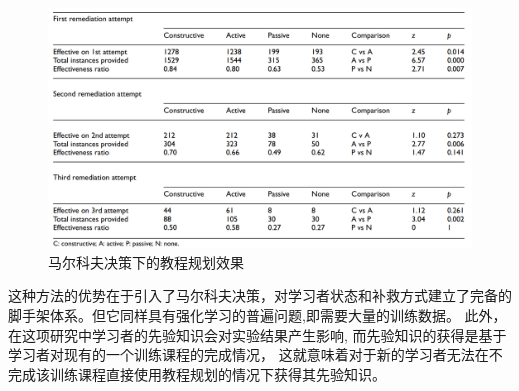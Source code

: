 \documentclass[12pt]{article}
\begin{document}
            \begin{figure}[H]
            	
            	\centering
            	\includegraphics[scale=0.25]{images/Markov_result.png}
            	\caption{马尔科夫决策下的教程规划效果}
            	\label{fig:label}
            \end{figure}

            这种方法的优势在于引入了马尔科夫决策，对学习者状态和补救方式建立了完备的脚手架体系。但它同样具有强化学习的普遍问题,即需要大量的训练数据。
            此外，在这项研究中学习者的先验知识会对实验结果产生影响,
            而先验知识的获得是基于学习者对现有的一个训练课程的完成情况，
            这就意味着对于新的学习者无法在不完成该训练课程直接使用教程规划的情况下获得其先验知识。
\end{document}
